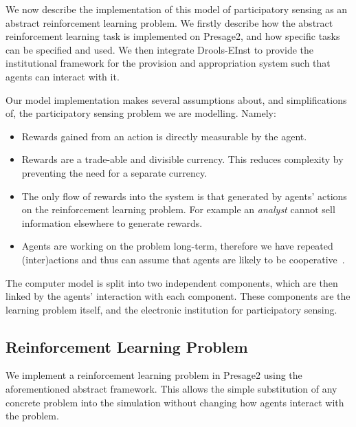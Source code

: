 We now describe the implementation of this model of participatory sensing as an abstract reinforcement learning problem. We firstly describe how the abstract reinforcement learning task is implemented on Presage2, and how specific tasks can be specified and used. We then integrate Drools-EInst to provide the institutional framework for the provision and appropriation system such that agents can interact with it. 

Our model implementation makes several assumptions about, and simplifications of, the participatory sensing problem we are modelling. Namely:

\begin{itemize}
\item Rewards gained from an action is directly measurable by the agent.
\item Rewards are a trade-able and divisible currency. This reduces complexity by preventing the need for a separate currency.
\item The only flow of rewards into the system is that generated by agents' actions on the reinforcement learning problem. For example an \emph{analyst} cannot sell information elsewhere to generate rewards.
\item Agents are working on the problem long-term, therefore we have repeated (inter)actions and thus can assume that agents are likely to be cooperative~\citep{Axelrod1984}.
\end{itemize}

The computer model is split into two independent components, which are then
linked by the agents' interaction with each component. These components are
the learning problem itself, and the electronic institution for participatory
sensing.

\subsection{Reinforcement Learning Problem}

We implement a reinforcement learning problem in Presage2 using the
aforementioned abstract framework. This allows the simple substitution of any
concrete problem into the simulation without changing how agents interact with
the problem.

